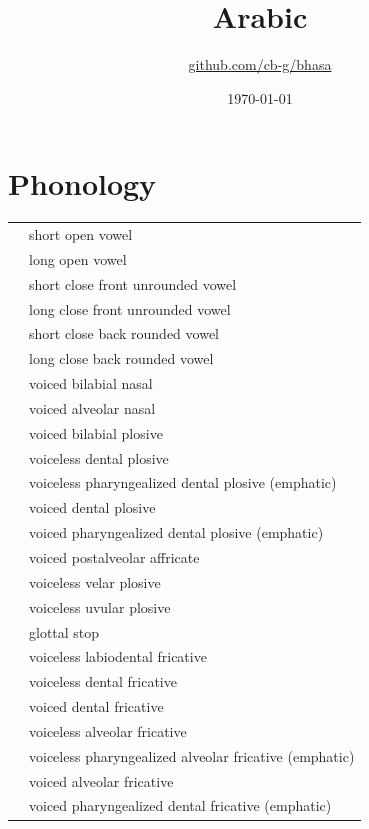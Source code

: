 \documentclass{article}
\title{Arabic\\\ipa{[al Qara"bij:a]}}
\author{\href{https://github.com/cb-g/bhasa}{github.com/cb-g/bhasa}}
\date{\today}
\begin{document}
\pagecolor{custom_bg}\color{custom_fg}
\maketitle\thispagestyle{empty}

\newpage\setcounter{page}{1}\section{Phonology}

\begin{xltabular}{\textwidth}{lL}
   & short open vowel \\
   & long open vowel \\
   & short close front unrounded vowel \\
   & long close front unrounded vowel \\
   & short close back rounded vowel \\
   & long close back rounded vowel \\
   & voiced bilabial nasal \\
   & voiced alveolar nasal \\
   & voiced bilabial plosive \\
   & voiceless dental plosive \\
   & voiceless pharyngealized dental plosive (emphatic) \\
   & voiced dental plosive \\
   & voiced pharyngealized dental plosive (emphatic) \\
   & voiced postalveolar affricate \\
   & voiceless velar plosive \\
   & voiceless uvular plosive \\
   & glottal stop \\
   & voiceless labiodental fricative \\
   & voiceless dental fricative \\
   & voiced dental fricative \\
   & voiceless alveolar fricative \\
   & voiceless pharyngealized alveolar fricative (emphatic) \\
   & voiced alveolar fricative \\
   & voiced pharyngealized dental fricative (emphatic) \\

\end{xltabular}
\end{document}
